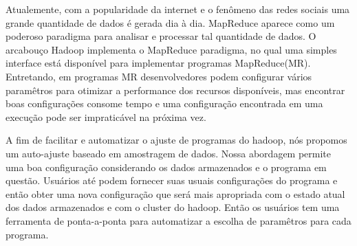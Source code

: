 Atualemente, com a popularidade da internet e o fenômeno das redes sociais uma grande
quantidade de dados é gerada dia à dia. MapReduce aparece como um poderoso paradigma
para analisar e processar tal quantidade de dados. O arcabouço Hadoop implementa
o MapReduce paradigma, no qual uma simples interface está disponível para implementar
programas MapReduce(MR). Entretando, em programas MR desenvolvedores podem configurar
vários paramêtros para otimizar a performance dos recursos disponíveis, mas encontrar
boas configurações consome tempo e uma configuração encontrada em uma execução pode
ser impraticável na próxima vez.

A fim de facilitar e automatizar o ajuste de programas do hadoop, nós propomos um
auto-ajuste baseado em amostragem de dados. Nossa abordagem permite uma boa configuração
considerando os dados armazenados e o programa em questão. Usuários até podem fornecer
suas usuais configurações do programa e então obter uma nova configuração que será
mais apropriada com o estado atual dos dados armazenados e com o cluster do hadoop.
Então os usuários tem uma ferramenta de ponta-a-ponta para automatizar a escolha
de paramêtros para cada programa.
